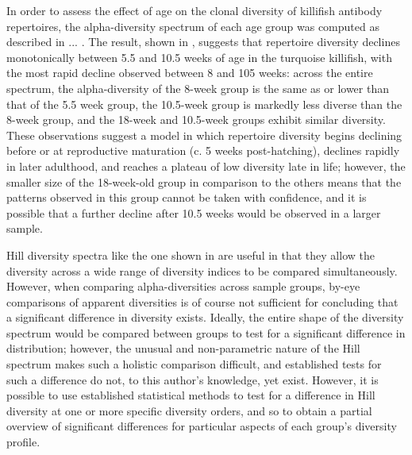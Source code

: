 In order to assess the effect of age on the clonal diversity of killifish antibody repertoires, the alpha-diversity spectrum of each age group was computed as described in ... . The result, shown in , suggests that repertoire diversity declines monotonically between 5.5 and 10.5 weeks of age in the turquoise killifish, with the most rapid decline observed between 8 and 105 weeks: across the entire spectrum, the alpha-diversity of the 8-week group is the same as or lower than that of the 5.5 week group, the 10.5-week group is markedly less diverse than the 8-week group, and the 18-week and 10.5-week groups exhibit similar diversity. These observations suggest a model in which repertoire diversity begins declining before or at reproductive maturation (c. 5 weeks post-hatching), declines rapidly in later adulthood, and reaches a plateau of low diversity late in life; however, the smaller size of the 18-week-old group in comparison to the others means that the patterns observed in this group cannot be taken with confidence, and it is possible that a further decline after 10.5 weeks would be observed in a larger sample.

Hill diversity spectra like the one shown in  are useful in that they allow the diversity across a wide range of diversity indices to be compared simultaneously. However, when comparing alpha-diversities across sample groups, by-eye comparisons of apparent diversities is of course not sufficient for concluding that a significant difference in diversity exists. Ideally, the entire shape of the diversity spectrum would be compared between groups to test for a significant difference in distribution; however, the unusual and non-parametric nature of the Hill spectrum makes such a holistic comparison difficult, and established tests for such a difference do not, to this author's knowledge, yet exist. However, it is possible to use established statistical methods to test for a difference in Hill diversity at one or more specific diversity orders, and so to obtain a partial overview of significant differences for particular aspects of each group's diversity profile.

